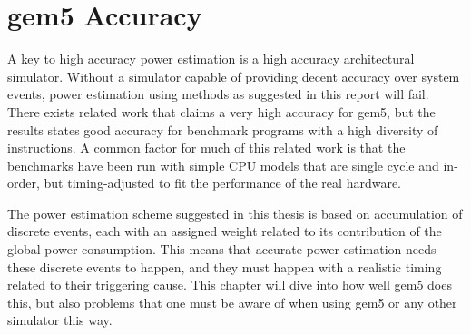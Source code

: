 \chapter{gem5 Accuracy}

A key to high accuracy power estimation is a high accuracy architectural
simulator. Without a simulator capable of providing decent accuracy over system
events, power estimation using methods as suggested in this report will fail.
There exists related work that claims a very high accuracy for
gem5\cite{butko2012accuracy,blem2013detailed}, but the results states
good accuracy for benchmark programs with a high diversity of instructions. A common
factor for much of this related work is that the benchmarks have been run with
simple CPU models that are single cycle and in-order, but timing-adjusted to fit
the performance of the real hardware.

The power estimation scheme suggested in this thesis is based on accumulation of discrete
events, each with an assigned weight related to its contribution of the global power consumption.
This means that accurate power estimation needs these discrete events to happen, and they must
happen with a realistic timing related to their triggering cause. This chapter will dive into
how well gem5 does this, but also problems that one must be aware of when using gem5 or any
other simulator this way.





